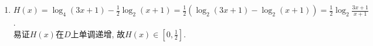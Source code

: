 \begin{enumerate}
\begin{jieda}
\begin{enumerate}[(1)]
\item $H(x)=\log_4(3x+1)-\frac{1}{2}\log_2(x+1)=\frac{1}{2}(\log_2(3x+1)-\log_2(x+1))=\frac{1}{2}\log_2\frac{3x+1}{x+1}$. \\
易证$H(x)$在$D$上单调递增, 故$H(x)\in[0,\frac{1}{2}]$. 
\end{enumerate}
\end{jieda}


\end{enumerate}